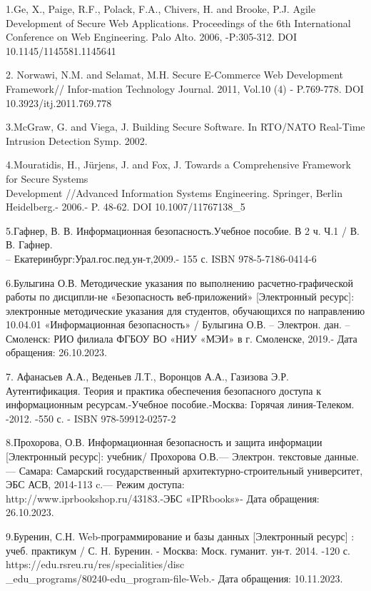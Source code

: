 \begin{noparindent}

1.Ge, X., Paige, R.F., Polack, F.A., Chivers, H. and Brooke, P.J. Agile
Development of Secure Web Applications. Proceedings of the 6th
International Conference on Web Engineering. Palo Alto. 2006,
-P:305-312. DOI 10.1145/1145581.1145641

2. Norwawi, N.M. and Selamat, M.H. Secure E-Commerce Web Development
Framework// Infor-mation Technology Journal. 2011, Vol.10 (4) -
P.769-778. DOI 10.3923/itj.2011.769.778

3.McGraw, G. and Viega, J. Building Secure Software. In RTO/NATO
Real-Time Intrusion Detection Symp. 2002.

4.Mouratidis, H., Jürjens, J. and Fox, J. Towards a Comprehensive
Framework for Secure Systems \\Development //Advanced Information Systems
Engineering. Springer, Berlin Heidelberg.- 2006.- P. 48-62. DOI
10.1007/11767138\_5

5.Гафнер, В. В. Информационная безопасность.Учебное пособие. В 2 ч. Ч.1
/ В. В. Гафнер.\\ -- Екатеринбург:Урал.гос.пед.ун-т,2009.- 155 с. ISBN
978-5-7186-0414-6

6.Булыгина О.В. Методические указания по выполнению расчетно-графической
работы по дисципли-не «Безопасность веб-приложений» {[}Электронный
ресурс{]}: электронные методические указания для студентов, обучающихся
по направлению 10.04.01 «Информационная безопасность» / Булыгина О.В. --
Электрон. дан. -- Смоленск: РИО филиала ФГБОУ ВО «НИУ «МЭИ» в г.
Смоленске, 2019.- Дата обращения: 26.10.2023.

7. Афанасьев А.А., Веденьев Л.Т., Воронцов А.А., Газизова Э.Р.
Аутентификация. Теория и практика обеспечения безопасного доступа к
информационным ресурсам.-Учебное пособие.-Москва: Горячая линия-Телеком.
-2012. -550 с. - ISBN 978-59912-0257-2

8.Прохорова, О.В. Информационная безопасность и защита информации
{[}Электронный ресурс{]}: учебник/ Прохорова О.В.--- Электрон. текстовые
данные.--- Самара: Самарский государственный архитектурно-строительный
университет, ЭБС АСВ, 2014-113 c.--- Режим доступа:
\\http://www.iprbookshop.ru/43183.-ЭБС «IPRbooks»- Дата обращения:
26.10.2023.

9.Буренин, С.Н. Web-программирование и базы данных {[}Электронный
ресурс{]} : учеб. практикум / С. Н. Буренин. - Москва: Моск. гуманит.
ун-т. 2014. -120 с. https://edu.rsreu.ru/res/specialities/disc\\\_edu\_programs/80240-edu\_program-file-Web.-
Дата обращения: 10.11.2023.


\end{noparindent}
